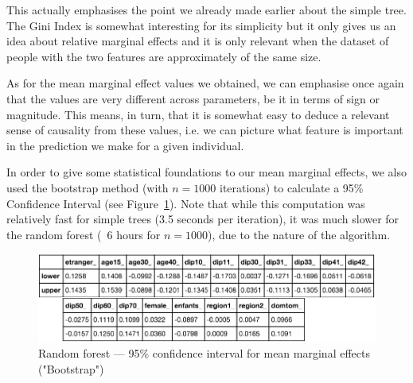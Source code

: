 This actually emphasises the point we already made earlier about the simple tree. The Gini Index is somewhat interesting for its simplicity but it only gives us an idea about relative marginal effects and it is only relevant when the dataset of people with the two features are approximately of the same size.

As for the mean marginal effect values we obtained,  we can emphasise once again that the values are very different across parameters, be it in terms of sign or magnitude. This means, in turn, that it is somewhat easy to deduce a relevant sense of causality from these values, i.e. we can picture what feature is important in the prediction we make for a given individual.

In order to give some statistical foundations to our mean marginal effects, we also used the bootstrap method (with $n=1000$ iterations) to calculate a 95\% Confidence Interval (see Figure~\ref{fig:random_forest_bootstrap}). Note that while this computation was relatively fast for simple trees (3.5 seconds per iteration), it was much slower for the random forest (~6 hours for $n=1000$), due to the nature of the algorithm.

\begin{figure}
    \centering
    \includegraphics[scale=0.25]{img/random_forest_bootstrap.png}
    \caption{Random forest --- 95\% confidence interval for mean marginal effects ("Bootstrap")}
    \label{fig:random_forest_bootstrap}
\end{figure}



